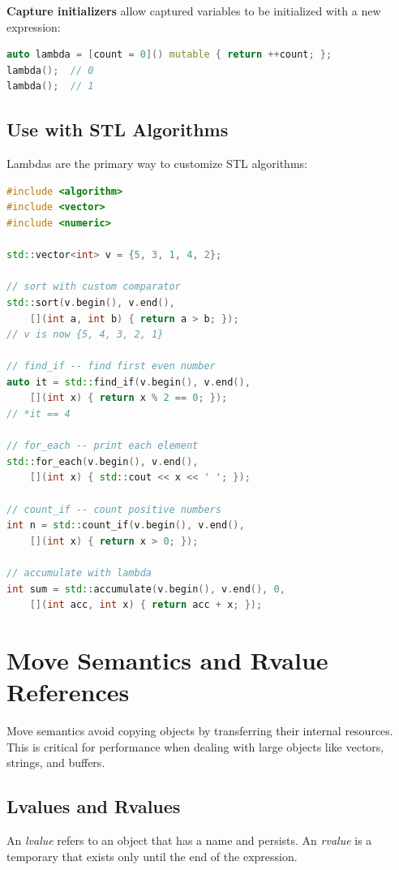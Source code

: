 \textbf{Capture initializers} allow captured variables to be initialized with a new expression:

\begin{lstlisting}[language=C++]
auto lambda = [count = 0]() mutable { return ++count; };
lambda();  // 0
lambda();  // 1
\end{lstlisting}

\subsection{Use with STL Algorithms}

Lambdas are the primary way to customize STL algorithms:

\begin{lstlisting}[language=C++]
#include <algorithm>
#include <vector>
#include <numeric>

std::vector<int> v = {5, 3, 1, 4, 2};

// sort with custom comparator
std::sort(v.begin(), v.end(),
    [](int a, int b) { return a > b; });
// v is now {5, 4, 3, 2, 1}

// find_if -- find first even number
auto it = std::find_if(v.begin(), v.end(),
    [](int x) { return x % 2 == 0; });
// *it == 4

// for_each -- print each element
std::for_each(v.begin(), v.end(),
    [](int x) { std::cout << x << ' '; });

// count_if -- count positive numbers
int n = std::count_if(v.begin(), v.end(),
    [](int x) { return x > 0; });

// accumulate with lambda
int sum = std::accumulate(v.begin(), v.end(), 0,
    [](int acc, int x) { return acc + x; });
\end{lstlisting}

\section{Move Semantics and Rvalue References}

Move semantics avoid copying objects by transferring their internal resources. This is critical for performance when dealing with large objects like vectors, strings, and buffers.

\subsection{Lvalues and Rvalues}

An \textit{lvalue} refers to an object that has a name and persists. An \textit{rvalue} is a temporary that exists only until the end of the expression.

